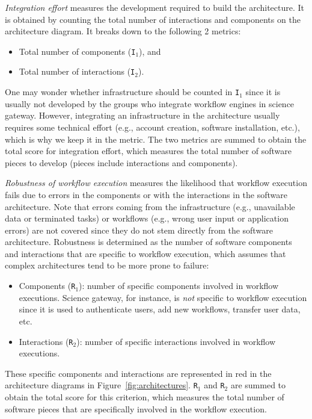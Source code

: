 \documentclass[preprint,3p,twocolumn]{elsarticle}
\begin{document}
\emph{Integration effort} measures the development required to build
the architecture. It is obtained by counting the total number of
interactions and components on the architecture diagram. It breaks
down to the following 2 metrics:
\begin{itemize}[leftmargin=0cm,itemindent=0.35cm,itemsep=0cm]
\item Total number of components (\texttt{I$_1$}), and
\item Total number of interactions (\texttt{I$_2$}).
\end{itemize}
One may wonder whether infrastructure should be counted in
\texttt{I$_1$} since it is usually not developed by the groups who
integrate workflow engines in science gateway. However, integrating an
infrastructure in the architecture usually requires some technical
effort (e.g., account creation, software installation, etc.), which is
why we keep it in the metric. The two metrics are summed to obtain the
total score for integration effort, which measures the total number of
software pieces to develop (pieces include interactions and
components).

\emph{Robustness of workflow execution} measures the likelihood that
workflow execution fails due to errors in the components or with the
interactions in the software architecture. Note that errors coming
from the infrastructure (e.g., unavailable data or terminated tasks) or
workflows (e.g., wrong user input or application errors) are not
covered since they do not stem directly from the software
architecture. Robustness is determined as the number of software
components and interactions that are specific to workflow execution,
which assumes that complex architectures tend to be more prone to failure:
\begin{itemize}[leftmargin=0cm,itemindent=0.35cm,itemsep=0cm]
\item Components (\texttt{R$_1$}): number of specific components
  involved in workflow executions. Science
gateway, for instance, is \emph{not} specific to workflow execution
since it is used to authenticate users, add new workflows, transfer
user data, etc.
\item Interactions (\texttt{R$_2$}): number of specific interactions
  involved in workflow executions.
\end{itemize}
These specific components and interactions are represented in red in
the architecture diagrams in
Figure~\ref{fig:architectures}. \texttt{R$_1$} and \texttt{R$_2$}  are summed to obtain the total score for this
criterion, which measures the total number of software pieces that are
specifically involved in the workflow execution.
\end{document}
